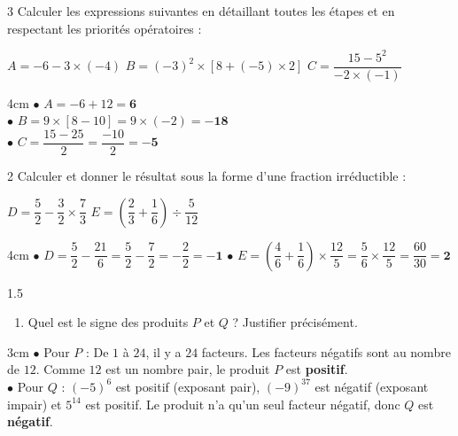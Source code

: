 \documentclass[a4paper]{book}
\begin{document}
{    
 \newpage
\setcounter{exo}{0}
\vspace{0.5cm}
    
    \begin{exerciceNote}{3}
        Calculer les expressions suivantes en détaillant toutes les étapes et en respectant les priorités opératoires :
        \medskip
        
        $A = -6 - 3 \times (-4)$ \hfill $B = (-3)^2 \times [8 + (-5) \times 2]$ \quad $C = \dfrac{15 - 5^2}{-2 \times (-1)}$
        
        \begin{ZoneReponse}{4cm}
        $\bullet$ $A = -6 + 12 = \mathbf{6}$ \\
        $\bullet$ $B = 9 \times [8 - 10] = 9 \times (-2) = \mathbf{-18}$ \\
        $\bullet$ $C = \dfrac{15 - 25}{2} = \dfrac{-10}{2} = \mathbf{-5}$
        \end{ZoneReponse}
    \end{exerciceNote}
    
        
    \begin{exerciceNote}{2}
        Calculer et donner le résultat sous la forme d'une fraction irréductible :
        \medskip
        
        $D = \dfrac{5}{2} - \dfrac{3}{2} \times \dfrac{7}{3}$ \quad $E = \left(\dfrac{2}{3} + \dfrac{1}{6}\right) \div \dfrac{5}{12}$
        
        \begin{ZoneReponse}{4cm}
        $\bullet$ $D = \dfrac{5}{2} - \dfrac{21}{6} = \dfrac{5}{2} - \dfrac{7}{2} = -\dfrac{2}{2} = \mathbf{-1}$ \quad 
        $\bullet$ $E = \left(\dfrac{4}{6} + \dfrac{1}{6}\right) \times \dfrac{12}{5} = \dfrac{5}{6} \times \dfrac{12}{5} = \dfrac{60}{30} = \mathbf{2}$
        \end{ZoneReponse}
    \end{exerciceNote}

        \begin{exerciceNote}{1.5}
        \begin{enumerate}
            \item Quel est le signe des produits $P$ et $Q$ ? Justifier précisément.
        \end{enumerate}
        \begin{ZoneReponse}{3cm}
        $\bullet$ Pour $P$ : De $1$ à $24$, il y a $24$ facteurs. Les facteurs négatifs sont au nombre de $12$. Comme $12$ est un nombre pair, le produit $P$ est \textbf{positif}. \\
        $\bullet$ Pour $Q$ : $(-5)^6$ est positif (exposant pair), $(-9)^{37}$ est négatif (exposant impair) et $5^{14}$ est positif. Le produit n'a qu'un seul facteur négatif, donc $Q$ est \textbf{négatif}.
        \end{ZoneReponse}
    \end{exerciceNote}
    
}
\end{document}
